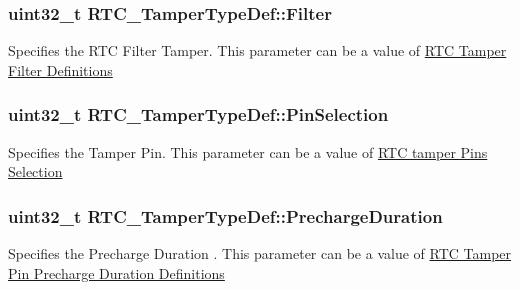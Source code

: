 \subsubsection[{\texorpdfstring{Filter}{Filter}}]{\setlength{\rightskip}{0pt plus 5cm}uint32\+\_\+t R\+T\+C\+\_\+\+Tamper\+Type\+Def\+::\+Filter}\hypertarget{struct_r_t_c___tamper_type_def_a41c032d76e9694654be4a80a572680c6}{}\label{struct_r_t_c___tamper_type_def_a41c032d76e9694654be4a80a572680c6}
Specifies the R\+TC Filter Tamper. This parameter can be a value of \hyperlink{group___r_t_c_ex___tamper___filter___definitions}{R\+TC Tamper Filter Definitions} 
\subsubsection[{\texorpdfstring{Pin\+Selection}{PinSelection}}]{\setlength{\rightskip}{0pt plus 5cm}uint32\+\_\+t R\+T\+C\+\_\+\+Tamper\+Type\+Def\+::\+Pin\+Selection}\hypertarget{struct_r_t_c___tamper_type_def_a676c56a1ad581d88cf71b5b54d5f7075}{}\label{struct_r_t_c___tamper_type_def_a676c56a1ad581d88cf71b5b54d5f7075}
Specifies the Tamper Pin. This parameter can be a value of \hyperlink{group___r_t_c_ex___tamper___pins___selection}{R\+TC tamper Pins Selection} 
\subsubsection[{\texorpdfstring{Precharge\+Duration}{PrechargeDuration}}]{\setlength{\rightskip}{0pt plus 5cm}uint32\+\_\+t R\+T\+C\+\_\+\+Tamper\+Type\+Def\+::\+Precharge\+Duration}\hypertarget{struct_r_t_c___tamper_type_def_ad447306575b3590e268fe3398f9bb517}{}\label{struct_r_t_c___tamper_type_def_ad447306575b3590e268fe3398f9bb517}
Specifies the Precharge Duration . This parameter can be a value of \hyperlink{group___r_t_c_ex___tamper___pin___precharge___duration___definitions}{R\+TC Tamper Pin Precharge Duration Definitions} 
